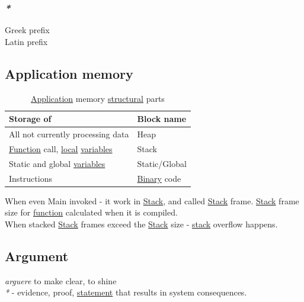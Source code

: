 \documentclass[11pt]{article}
\begin{document}
\subsubsection{\emph{*}}
\label{sec:org9149ec2}

\label{org8d0d652}Greek prefix\\
\label{org6406b17}Latin prefix\\

\subsection{\label{orgfcbe2e8}Application memory}
\label{sec:orgc666aa0}
\begin{table}[htbp]
\caption{\label{tab:application-memory-structural-parts}\hyperref[org2b89e66]{Application} memory \hyperref[org57ccb74]{structural} parts}
\centering
\begin{tabular}{ll}
Storage of & Block name\\
\hline
All not currently processing data & \label{orgb96b3af}Heap\\
\hyperref[orge15bc14]{Function} call, \hyperref[orgc8947ec]{local} \hyperref[orge17f54f]{variables} & \label{org02af145}Stack\\
Static and global \hyperref[orge17f54f]{variables} & Static/Global\\
Instructions & \hyperref[org57bd48f]{Binary} code\\
\end{tabular}
\end{table}

When even Main invoked - it work in \hyperref[org02af145]{Stack}, and called \hyperref[org02af145]{Stack} frame. \hyperref[org02af145]{Stack} frame size for \hyperref[orge15bc14]{function} calculated when it is compiled.\\
When stacked \hyperref[org02af145]{Stack} frames exceed the \hyperref[org02af145]{Stack} size - \hyperref[org02af145]{stack} overflow happens.\\

\subsection{\label{orga6b7e97}Argument}
\label{sec:org844312e}
\emph{arguere} to make clear, to shine\\

\emph{*} - evidence, proof, \hyperref[org36313c0]{statement} that results in system consequences.\\
\end{document}
